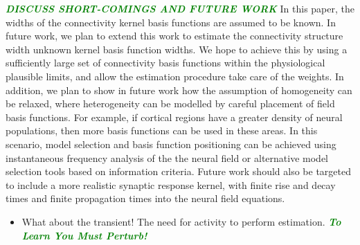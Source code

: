 \documentclass[twocolumn,11pt,a4paper]{article}		%
\newcommand{\dean}[1]{\textsf{\emph{\textbf{\textcolor{green}{#1}}}}}
\begin{document}
\dean{DISCUSS SHORT-COMINGS AND FUTURE WORK}
In this paper, the widths of the connectivity kernel basis functions are assumed to be known. In future work, we plan to extend this work to estimate the connectivity structure width unknown kernel basis function widths. We hope to achieve this by using a sufficiently large set of connectivity basis functions within the physiological plausible limits, and allow the estimation procedure take care of the weights. In addition, we plan to show in future work how the assumption of homogeneity can be relaxed, where heterogeneity can be modelled by careful placement of field basis functions. For example, if cortical regions have a greater density of neural populations, then more basis functions can be used in these areas. In this scenario, model selection and basis function positioning can be achieved using instantaneous frequency analysis of the the neural field or alternative model selection tools based on information criteria. Future work should also be targeted to include a more realistic synaptic response kernel, with finite rise and decay times and finite propagation times into the neural field equations.

\begin{itemize}
	\item What about the transient! The need for activity to perform estimation. \dean{To Learn You Must Perturb!} 
\end{itemize}
% 

\appendix 
\end{document}
